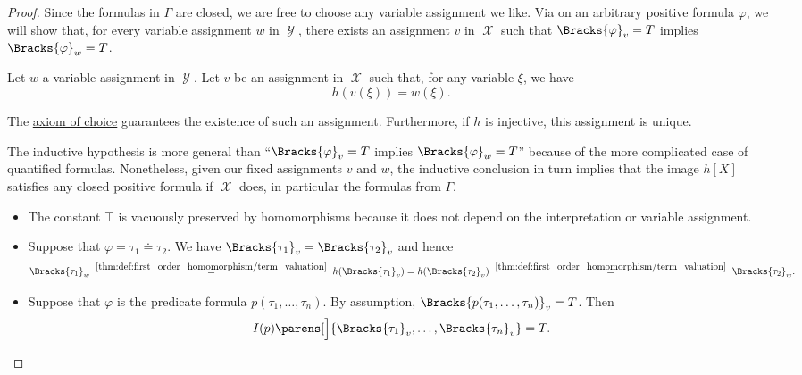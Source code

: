 \begin{proof}
  Since the formulas in \( \Gamma \) are closed, we are free to choose any variable assignment we like. Via  on an arbitrary positive formula \( \varphi \), we will show that, for every variable assignment \( w \) in \( \mscrY \), there exists an assignment \( v \) in \( \mscrX \) such that \( \Bracks{\varphi}_v = T \) implies \( \Bracks{\varphi}_w = T \).

  Let \( w \) a variable assignment in \( \mscrY \). Let \( v \) be an assignment in \( \mscrX \) such that, for any variable \( \xi \), we have
  \begin{equation*}
    h(v(\xi)) = w(\xi).
  \end{equation*}

  The \hyperref[def:zfc/choice]{axiom of choice} guarantees the existence of such an assignment. Furthermore, if \( h \) is injective, this assignment is unique.

  The inductive hypothesis is more general than \enquote{\( \Bracks{\varphi}_v = T \) implies \( \Bracks{\varphi}_w = T \)} because of the more complicated case of quantified formulas. Nonetheless, given our fixed assignments \( v \) and \( w \), the inductive conclusion in turn implies that the image \( h[X] \) satisfies any closed positive formula if \( \mscrX \) does, in particular the formulas from \( \Gamma \).

  \begin{itemize}
    \item The constant \( \top \) is vacuously preserved by homomorphisms because it does not depend on the interpretation or variable assignment.

    \item Suppose that \( \varphi = \tau_1 \doteq \tau_2 \). We have \( \Bracks{\tau_1}_v = \Bracks{\tau_2}_v \) and hence
    \begin{equation*}
      \Bracks{\tau_1}_w
      \reloset {\ref{thm:def:first_order_homomorphism/term_valuation}} =
      h(\Bracks{\tau_1}_v)
      =
      h(\Bracks{\tau_2}_v)
      \reloset {\ref{thm:def:first_order_homomorphism/term_valuation}} =
      \Bracks{\tau_2}_w.
    \end{equation*}

    \item Suppose that \( \varphi \) is the predicate formula \( p(\tau_1, \ldots, \tau_n) \). By assumption, \( \Bracks{p(\tau_1, \ldots, \tau_n)}_v = T \). Then
    \begin{equation}\label{eq:thm:positive_formulas_preserved_under_homomorphism/predicates/x}
      I(p) \parens[\Big]{ \Bracks{\tau_1}_v, \ldots, \Bracks{\tau_n}_v } = T.
    \end{equation}


\end{itemize}
\end{proof}
